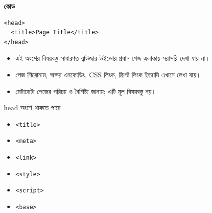 \par\noindent
\begin{minipage}[t]{.50\linewidth}\vspace{0pt}\small
\textbf{\color{chFourTeal}কোড}\par
\begin{verbatim}
<head>
  <title>Page Title</title>
</head>
\end{verbatim}

\par\smallskip
\end{minipage}\hfill
\begin{minipage}[t]{.46\linewidth}\vspace{0pt}\small
\begin{itemize}
\item এই অংশের বিষয়বস্তু সাধারণত ব্রাউজার উইন্ডোর প্রধান পেজ এলাকায় সরাসরি দেখা যায় না।
\item পেজ শিরোনাম, অক্ষর এনকোডিং, CSS লিংক, স্ক্রিপ্ট লিংক ইত্যাদি এখানে লেখা যায়।
\item মেটাডেটা পেজের পরিচয় ও বৈশিষ্ট্য জানায়; এটি মূল বিষয়বস্তু নয়।
\end{itemize}
\end{minipage}\par


\begin{keypointbox}{head অংশে থাকতে পারে}
\par\noindent
\begin{minipage}[t]{.48\linewidth}\vspace{0pt}
\begin{itemize}
\item \texttt{<title>}
\item \texttt{<meta>}
\item \texttt{<link>}
\end{itemize}
\end{minipage}\hfill
\begin{minipage}[t]{.48\linewidth}\vspace{0pt}
\begin{itemize}
\item \texttt{<style>}
\item \texttt{<script>}
\item \texttt{<base>}
\end{itemize}
\end{minipage}\par

\end{keypointbox}

